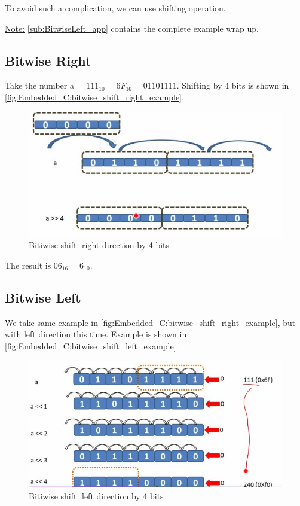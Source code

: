 To avoid such a complication, we can use shifting operation.

\underline{Note:} \ref{sub:BitwiseLeft_app} contains the complete example wrap up.

\subsection{Bitwise Right}

Take the number a = $111_{10} = 6 F_{16} = 0110 1111$. Shifting by 4 bits is shown in \autoref{fig:Embedded_C:bitwise_shift_right_example}.

\begin{figure}[h]
\centering
\includegraphics[scale=0.7]{Figures/Embedded_C/bitwise_shift_right_example}
\caption{Bitiwise shift: right direction by 4 bits}
\label{fig:Embedded_C:bitwise_shift_right_example}
\end{figure}

The result is $06_{16} = 6_{10}$.

\subsection{Bitwise Left}

We take same example in \autoref{fig:Embedded_C:bitwise_shift_right_example}, but with left direction this time. Example is shown in \autoref{fig:Embedded_C:bitwise_shift_left_example}.

\begin{figure}[h]
\centering
\includegraphics[scale=0.7]{Figures/Embedded_C/bitwise_shift_left_example}
\caption{Bitiwise shift: left direction by 4 bits}
\label{fig:Embedded_C:bitwise_shift_left_example}
\end{figure}

